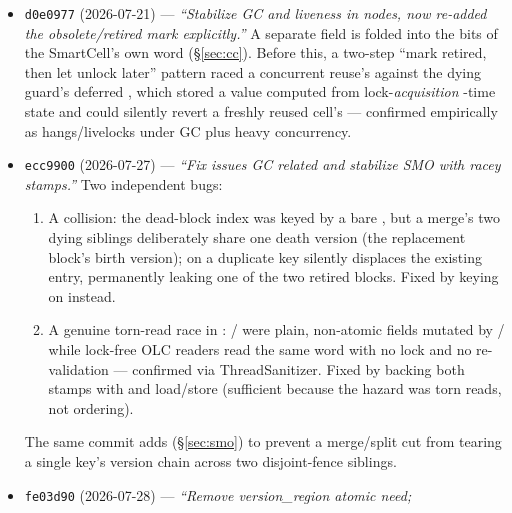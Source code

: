 \documentclass[11pt]{article}
\newcommand{\commit}[1]{\texttt{#1}}
\begin{document}
\begin{itemize}
  \item \commit{d0e0977} (2026-07-21) --- \emph{``Stabilize GC and liveness in
        nodes, now re-added the obsolete/retired mark explicitly.''} A separate
         field is folded into the 
        bits of the SmartCell's own  word (\S\ref{sec:cc}). Before
        this, a two-step ``mark retired, then let  unlock later'' pattern
        raced a concurrent reuse's  against the dying guard's
        deferred , which stored a value computed from lock-\emph{acquisition}
        -time state and could silently revert a freshly reused cell's 
        --- confirmed empirically as hangs/livelocks under GC plus heavy concurrency.
  \item \commit{ecc9900} (2026-07-27) --- \emph{``Fix issues GC related and stabilize
        SMO with racey stamps.''} Two independent bugs:
        \begin{enumerate}
          \item A  collision: the dead-block index was keyed by a bare
                , but a merge's two dying siblings deliberately share one
                death version (the replacement block's birth version); 
                on a duplicate key silently displaces the existing entry, permanently
                leaking one of the two retired blocks. Fixed by keying on
                 instead.
          \item A genuine torn-read race in : /
                 were plain, non-atomic  fields mutated
                by / while lock-free OLC readers read the
                same word with no lock and no re-validation --- confirmed via
                ThreadSanitizer. Fixed by backing both stamps with  and
                 load/store (sufficient because the hazard was torn reads,
                not ordering).
        \end{enumerate}
        The same commit adds  (\S\ref{sec:smo}) to prevent a
        merge/split cut from tearing a single key's version chain across two
        disjoint-fence siblings.
  \item \commit{fe03d90} (2026-07-28) --- \emph{``Remove version\_region atomic need;
}
\end{itemize}
\end{document}

